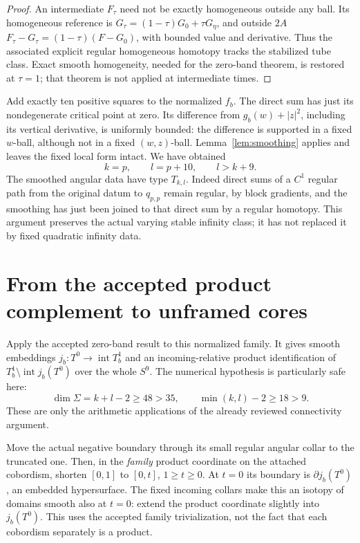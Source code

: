 \documentclass[11pt]{article}
\newcommand{\Int}{\operatorname{int}}
\begin{document}
\begin{proof}
An intermediate \(F_\tau\) need not be exactly homogeneous outside
any ball. Its homogeneous reference is
\(G_\tau=(1-\tau)G_0+\tau G_\eta\), and outside \(2A\)
\(F_\tau-G_\tau=(1-\tau)(F-G_0)\), with bounded value and derivative.
Thus the associated explicit regular homogeneous homotopy tracks
the stabilized tube class. Exact smooth homogeneity, needed for the
zero-band theorem, is restored at \(\tau=1\); that theorem is not
applied at intermediate times.
\end{proof}

Add exactly ten positive squares to the normalized \(f_b\).
The direct sum has just its nondegenerate critical point at zero.
Its difference from \(g_b(w)+|z|^2\), including its vertical derivative,
is uniformly bounded: the difference is supported in a fixed
\(w\)-ball, although not in a fixed \((w,z)\)-ball.
Lemma~\ref{lem:smoothing} applies and leaves the fixed local form intact.
We have obtained
\[
 k=p,\qquad l=p+10,\qquad l>k+9.                    \tag{14}
\]
The smoothed angular data have type \(T_{k,l}\). Indeed direct
sums of a \(C^1\) regular path from the original datum to
\(q_{p,p}\) remain regular, by block gradients, and the smoothing
has just been joined to that direct sum by a regular homotopy.
This argument preserves the actual varying stable infinity class;
it has not replaced it by fixed quadratic infinity data.

\section{From the accepted product complement to unframed cores}

Apply the accepted zero-band result to this normalized family.
It gives smooth embeddings \(j_b:T^0\to\Int T_b^1\) and an
incoming-relative product identification of
\(T_b^1\setminus\Int j_b(T^0)\) over the whole \(S^9\).
The numerical hypothesis is particularly safe here:
\[
 \dim\Sigma=k+l-2\geq48>35,\qquad
 \min(k,l)-2\geq18>9 .
 \tag{15}
\]
These are only the arithmetic applications of the already
reviewed connectivity argument.

Move the actual negative boundary through its small regular angular
collar to the truncated one. Then, in the \emph{family} product
coordinate on the attached cobordism, shorten \([0,1]\) to
\([0,t]\), \(1\geq t\geq0\). At \(t=0\) its boundary is
\(\partial j_b(T^0)\), an embedded hypersurface.
The fixed incoming collars make this an isotopy of domains smooth
also at \(t=0\): extend the product coordinate slightly into
\(j_b(T^0)\). This uses the accepted family trivialization, not
the fact that each cobordism separately is a product.
\end{document}
